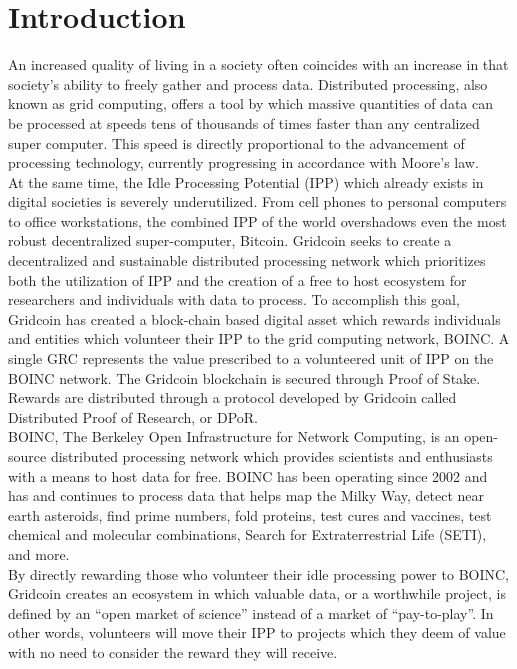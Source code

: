 \section{Introduction}
\label{sec:intro}

An increased quality of living in a society often coincides with an increase in that society’s ability to freely gather and process data.  Distributed processing, also known as grid computing, offers a tool by which massive quantities of data can be processed at speeds tens of thousands of times faster than any centralized super computer.  This speed is directly proportional to the advancement of processing technology, currently progressing in accordance with Moore’s law. \\

At the same time, the Idle Processing Potential (IPP) which already exists in digital societies is severely underutilized.  From cell phones to personal computers to office workstations, the combined IPP of the world overshadows even the most robust decentralized super-computer, Bitcoin.
Gridcoin seeks to create a decentralized and sustainable distributed processing network which prioritizes both the utilization of IPP and the creation of a free to host ecosystem for researchers and individuals with data to process.
To accomplish this goal, Gridcoin has created a block-chain based digital asset which rewards individuals and entities which volunteer their IPP to the grid computing network, BOINC.  A single GRC represents the value prescribed to a volunteered unit of IPP on the BOINC network.  The Gridcoin blockchain is secured through Proof of Stake.  Rewards are distributed through a protocol developed by Gridcoin called Distributed Proof of Research, or DPoR.\\

BOINC, The Berkeley Open Infrastructure for Network Computing, is an open-source distributed processing network which provides scientists and enthusiasts with a means to host data for free. BOINC has been operating since 2002 and has and continues to process data that helps map the Milky Way, detect near earth asteroids, find prime numbers, fold proteins, test cures and vaccines, test chemical and molecular combinations, Search for Extraterrestrial Life (SETI), and more.\\

By directly rewarding those who volunteer their idle processing power to BOINC, Gridcoin creates an ecosystem in which valuable data, or a worthwhile project, is defined by an “open market of science” instead of a market of “pay-to-play”.  In other words, volunteers will move their IPP to projects which they deem of value with no need to consider the reward they will receive.\\

